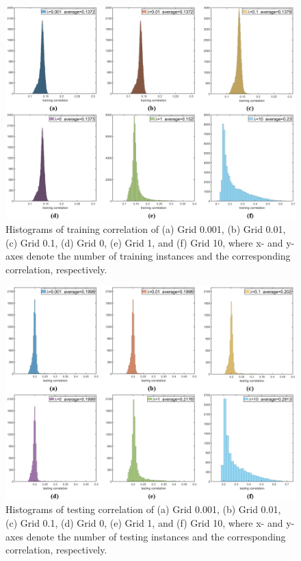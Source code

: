 \documentclass[review,10pt]{JMtemplate}
\begin{document}
\begin{figure}[t]
\centering
\includegraphics[width=1\textwidth]{Figs/correlation_training.png}
\caption{Histograms of training correlation of (a) Grid 0.001, (b) Grid 0.01, (c) Grid 0.1, (d) Grid 0, (e) Grid 1, and (f) Grid 10, where x- and y-axes denote the number of training instances and the corresponding correlation, respectively.}
\label{fig:correlation_training}
\end{figure}


\begin{figure}[t]
\centering
\includegraphics[width=1\textwidth]{Figs/correlation_testing.png}
\caption{Histograms of testing correlation of (a) Grid 0.001, (b) Grid 0.01, (c) Grid 0.1, (d) Grid 0, (e) Grid 1, and (f) Grid 10, where x- and y-axes denote the number of testing instances and the corresponding correlation, respectively.}
\label{fig:correlation_testing}
\end{figure}
\end{document}
